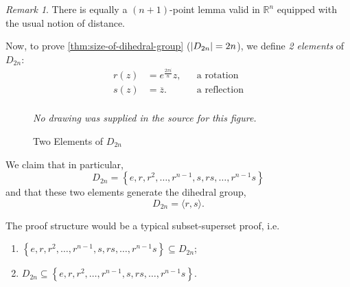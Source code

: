 \documentclass{article}
\theoremstyle{definition}
\theoremstyle{remark}
\newtheorem{remark}[theorem]{Remark}
\DeclarePairedDelimiter{\abs}{\lvert}{\rvert}
\newcommand{\pqty}[1]{\left(#1\right)}
\newcommand{\Bqty}[1]{\left\{#1\right\}}
\newcommand{\angBrac}[1]{\langle #1\rangle}
\newcommand{\conjugate}[1]{\overline{#1}}
\newcommand{\RR}{\mathbb{R}}
\begin{document}
\begin{remark}
    There is equally a \(\pqty{n + 1}\)-point lemma valid in \(\RR^n\) equipped with the usual notion of distance.
\end{remark}

Now, to prove \autoref{thm:size-of-dihedral-group} (\(\abs{D_{2n}} = 2n\)), we define \emph{2 elements} of \(D_{2n}\):
\begin{align*}
    r\pqty{z} &= e^{\frac{2 \pi i}{n}} z, && \text{a rotation} \\
    s\pqty{z} &= \conjugate{z}. && \text{a reflection} \\
\end{align*}

\begin{figure}[ht!]
    \centering
    \emph{No drawing was supplied in the source for this figure.}\par
\caption{Two Elements of \(D_{2n}\)}
    \label{fig:two-elements-of-d-2n}
\end{figure}

We claim that in particular,
\[
    D_{2n} = \Bqty{e, r, r^2, \ldots, r^{n - 1}, s, rs, \ldots, r^{n - 1} s}
\]
and that these two elements generate the dihedral group,
\[
    D_{2n} = \angBrac{r, s}.
\]

The proof structure would be a typical subset-superset proof, i.e.
\begin{enumerate}
    \item \(\Bqty{e, r, r^2, \ldots, r^{n - 1}, s, rs, \ldots, r^{n - 1} s} \subseteq D_{2n}\);
    \item \(D_{2n} \subseteq \Bqty{e, r, r^2, \ldots, r^{n - 1}, s, rs, \ldots, r^{n - 1} s}\).
\end{enumerate}
\end{document}
